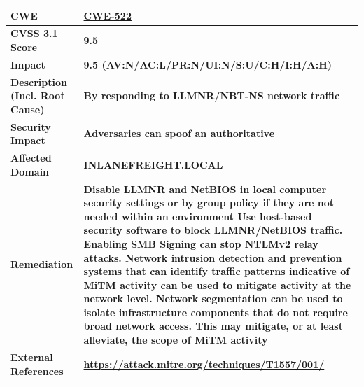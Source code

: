 {\begin{table}[h!]
    \centering
    \begin{tabular}{|p{3cm}|p{15cm}|} 
        \hline
        \rowcolor{TableBgRowColor}        
        \cellcolor{MediumVulnColor} \textbf{CWE} & 
        \textbf{\href{https://cwe.mitre.org/data/definitions/522.html}{CWE-522} } \\
        \hline
        \rowcolor{TableBgRowIntemediaColor}
        \cellcolor{MediumVulnColor} \textbf{CVSS 3.1 Score} & 
        \textbf{9.5} \\
        \hline
        \rowcolor{TableBgRowColor}
        \cellcolor{MediumVulnColor} \textbf{Impact} & 
        \textbf{9.5 (AV:N/AC:L/PR:N/UI:N/S:U/C:H/I:H/A:H)} \\
        \hline
        \rowcolor{TableBgRowIntemediaColor}        
        \cellcolor{MediumVulnColor} \textbf{Description (Incl. Root
Cause)} & 
        \textbf{By responding to LLMNR/NBT-NS network traffic} \\
        \hline        
        \rowcolor{TableBgRowColor}        
        \cellcolor{MediumVulnColor} \textbf{Security Impact} & 
        \textbf{Adversaries can spoof an authoritative } \\
        \hline
        \rowcolor{TableBgRowIntemediaColor}        
        \cellcolor{MediumVulnColor} \textbf{Affected Domain} & 
        \textbf{INLANEFREIGHT.LOCAL} \\
        \hline
        \rowcolor{TableBgRowColor}        
        \cellcolor{MediumVulnColor} \textbf{Remediation} & 
        \textbf{Disable LLMNR and NetBIOS in local computer security settings or by group policy if
they are not needed within an environment
 Use host-based security software to block LLMNR/NetBIOS traffic. Enabling SMB
Signing can stop NTLMv2 relay attacks.
 Network intrusion detection and prevention systems that can identify traffic patterns
indicative of MiTM activity can be used to mitigate activity at the network level.
 Network segmentation can be used to isolate infrastructure components that do not
require broad network access. This may mitigate, or at least alleviate, the scope of
MiTM activity} \\
        \hline
        \rowcolor{TableBgRowIntemediaColor}        
        \cellcolor{MediumVulnColor} \textbf{External References} & 
        \textbf{\url{https://attack.mitre.org/techniques/T1557/001/}} \\
        \hline
    \end{tabular}
\end{table}


}
